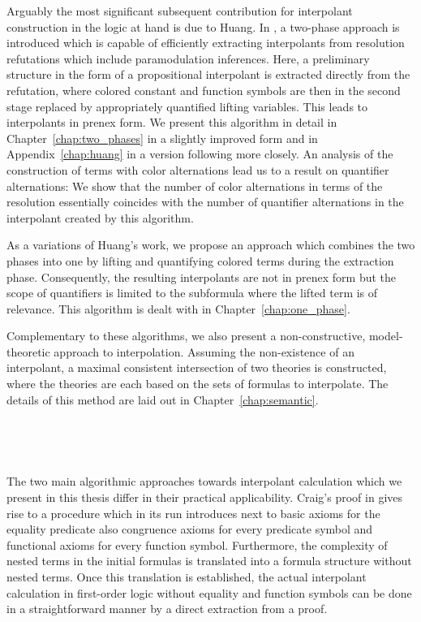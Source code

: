 Arguably the most significant subsequent contribution for interpolant construction in the logic at hand is due to Huang.
In \cite{Huang95}, a two-phase approach is introduced which is capable of efficiently extracting interpolants from resolution refutations which include paramodulation inferences.
Here, a preliminary structure in the form of a propositional interpolant is extracted directly from the refutation, where colored constant and function symbols are then in the second stage replaced by appropriately quantified lifting variables.
This leads to interpolants in prenex form.
We present this algorithm in detail in Chapter~\ref{chap:two_phases} in a slightly improved form and in Appendix~\ref{chap:huang} in a version following \cite{Huang95} more closely. 
An analysis of the construction of terms with color alternations lead us to a result on quantifier alternations:
We show that the number of color alternations in terms of the resolution essentially coincides with the number of quantifier alternations in the interpolant created by this algorithm.



As a variations of Huang's work, we propose an approach which combines the two phases into one 
by lifting and quantifying colored terms during the extraction phase. 
Consequently, the resulting interpolants are not in prenex form but the scope of quantifiers is limited to the subformula where the lifted term is of relevance.
This algorithm is dealt with in Chapter~\ref{chap:one_phase}.

Complementary to these algorithms, we also present a non-constructive, model-theoretic approach to interpolation.
Assuming the non-existence of an interpolant, a maximal consistent intersection of two theories is constructed, where the theories are each based on the sets of formulas to interpolate. The details of this method are laid out in Chapter~\ref{chap:semantic}.


~

~

The two main algorithmic approaches towards interpolant calculation which we present in this thesis differ in their practical applicability. 
Craig's proof in \cite{Craig57linear,Craig57three} gives rise to a procedure which in its run introduces next to basic axioms for the equality predicate also congruence axioms for every predicate symbol and functional axioms for every function symbol.
Furthermore, the complexity of nested terms in the initial formulas is translated into a formula structure without nested terms.
Once this translation is established, the actual interpolant calculation in first-order logic without equality and function symbols can be done in a straightforward manner by a direct extraction from a proof.


